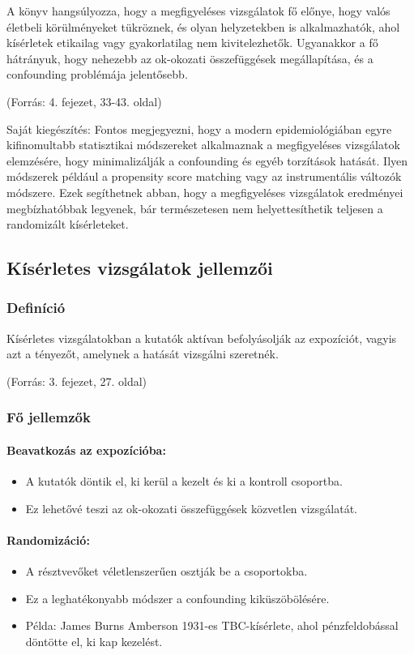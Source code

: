 \documentclass[a4paper,12pt]{article}
\begin{document}
    A könyv hangsúlyozza, hogy a megfigyeléses vizsgálatok fő előnye, hogy valós életbeli körülményeket tükröznek, és olyan helyzetekben is alkalmazhatók, ahol kísérletek etikailag vagy gyakorlatilag nem kivitelezhetők. Ugyanakkor a fő hátrányuk, hogy nehezebb az ok-okozati összefüggések megállapítása, és a confounding problémája jelentősebb.

    (Forrás: 4. fejezet, 33-43. oldal)

    Saját kiegészítés: Fontos megjegyezni, hogy a modern epidemiológiában egyre kifinomultabb statisztikai módszereket alkalmaznak a megfigyeléses vizsgálatok elemzésére, hogy minimalizálják a confounding és egyéb torzítások hatását. Ilyen módszerek például a propensity score matching vagy az instrumentális változók módszere. Ezek segíthetnek abban, hogy a megfigyeléses vizsgálatok eredményei megbízhatóbbak legyenek, bár természetesen nem helyettesíthetik teljesen a randomizált kísérleteket.

    \subsection{Kísérletes vizsgálatok jellemzői}

    \subsubsection{Definíció}
    Kísérletes vizsgálatokban a kutatók aktívan befolyásolják az expozíciót, vagyis azt a tényezőt, amelynek a hatását vizsgálni szeretnék.

    (Forrás: 3. fejezet, 27. oldal)

    \subsubsection{Fő jellemzők}

    \paragraph{Beavatkozás az expozícióba:}
    \begin{itemize}
        \item A kutatók döntik el, ki kerül a kezelt és ki a kontroll csoportba.
        \item Ez lehetővé teszi az ok-okozati összefüggések közvetlen vizsgálatát.
    \end{itemize}

    \paragraph{Randomizáció:}
    \begin{itemize}
        \item A résztvevőket véletlenszerűen osztják be a csoportokba.
        \item Ez a leghatékonyabb módszer a confounding kiküszöbölésére.
        \item Példa: James Burns Amberson 1931-es TBC-kísérlete, ahol pénzfeldobással döntötte el, ki kap kezelést.
    \end{itemize}
\end{document}
